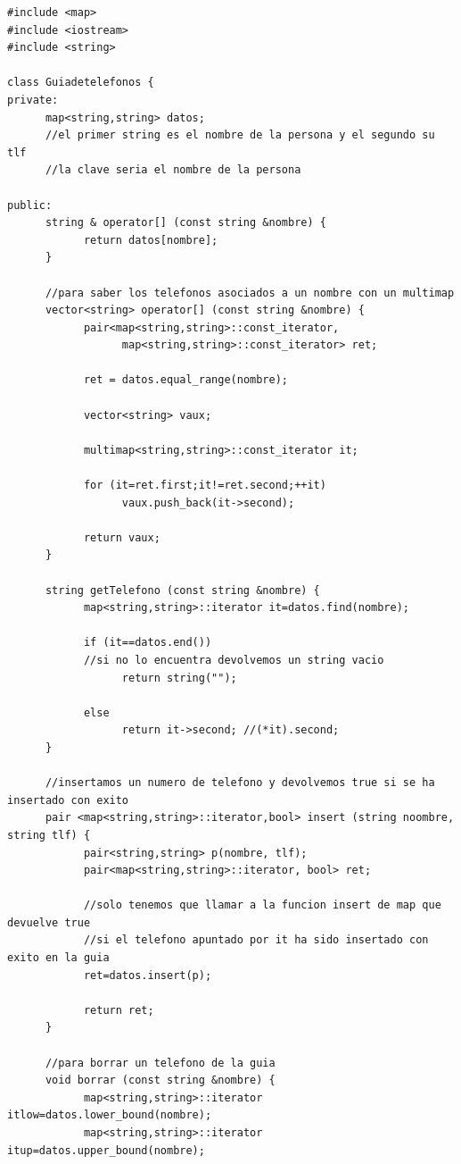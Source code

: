 \documentclass[10pt,a4paper,spanish]{report}
\begin{document}
\begin{verbatim}
#include <map>
#include <iostream>
#include <string>

class Guiadetelefonos {
private:
      map<string,string> datos;
      //el primer string es el nombre de la persona y el segundo su tlf
      //la clave seria el nombre de la persona

public:
      string & operator[] (const string &nombre) {
            return datos[nombre];
      }

      //para saber los telefonos asociados a un nombre con un multimap
      vector<string> operator[] (const string &nombre) {
            pair<map<string,string>::const_iterator,
                  map<string,string>::const_iterator> ret;

            ret = datos.equal_range(nombre);

            vector<string> vaux;

            multimap<string,string>::const_iterator it;

            for (it=ret.first;it!=ret.second;++it)
                  vaux.push_back(it->second);

            return vaux;
      }

      string getTelefono (const string &nombre) {
            map<string,string>::iterator it=datos.find(nombre);

            if (it==datos.end())
            //si no lo encuentra devolvemos un string vacio
                  return string("");

            else
                  return it->second; //(*it).second;
      }

      //insertamos un numero de telefono y devolvemos true si se ha insertado con exito
      pair <map<string,string>::iterator,bool> insert (string noombre, string tlf) {
            pair<string,string> p(nombre, tlf);
            pair<map<string,string>::iterator, bool> ret;

            //solo tenemos que llamar a la funcion insert de map que devuelve true
            //si el telefono apuntado por it ha sido insertado con exito en la guia
            ret=datos.insert(p);

            return ret;
      }

      //para borrar un telefono de la guia
      void borrar (const string &nombre) {
            map<string,string>::iterator itlow=datos.lower_bound(nombre);
            map<string,string>::iterator itup=datos.upper_bound(nombre);


\end{verbatim}
\end{document}
